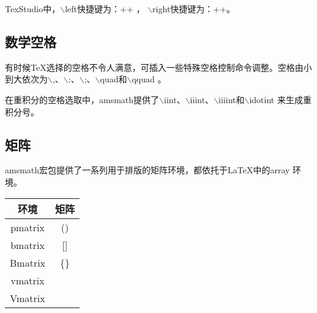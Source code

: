 TexStudio中，$\backslash$left快捷键为：++ ， $\backslash$right快捷键为：++。

\subsection{数学空格}
有时候\TeX{}选择的空格不令人满意，可插入一些特殊空格控制命令调整。空格由小到大依次为$\backslash$,、$\backslash$:、$\backslash$;、$\backslash$quad和$\backslash$qquad 。

在重积分的空格选取中，amsmath提供了$\backslash$iint、$\backslash$iiint、$\backslash$iiiint和$\backslash$idotint 来生成重积分号。

\subsection{矩阵}
amsmath宏包提供了一系列用于排版的矩阵环境，都依托于\LaTeX{}中的array 环境。
\begin{table}[htbp]
	\centering
	\vspace{0.2cm}
	\zhongwu
	\begin{tabular}{cc}
		\toprule
		环境  & 矩阵 \\
		\midrule
		pmatrix   &     ()   \\
		bmatrix   &     []   \\
		Bmatrix	  &   \{\}   \\
		vmatrix   &          \\
		Vmatrix   &          \\ 
		\bottomrule
	\end{tabular}
\end{table}

